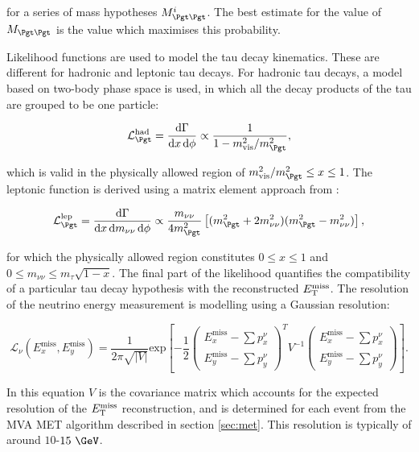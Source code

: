 for a series of mass hypotheses $M_{\Pgt\Pgt}^{i}$. The best estimate for the
value of $M_{\Pgt\Pgt}$ is the value which maximises this probability. 

Likelihood functions are used to model the tau decay kinematics. These are
different for hadronic and leptonic tau decays. For hadronic tau decays, a model
based on two-body phase space is used\cite{PDG}, in which all the decay products of the
tau are grouped to be one particle:

\begin{equation}
\mathcal{L}_{\Pgt}^{\text{had}} = \frac{\text{d}\Gamma}{\text{d}x\,\text{d}\phi}
\propto \frac{1}{1 - m_{\text{vis}}^{2} / m_{\Pgt}^{2}},
\end{equation}

which is valid in the physically allowed region of $m_{\text{vis}}^{2} /
m_{\Pgt}^{2} \leq x \leq 1$. The leptonic function is derived using a matrix
element approach from \cite{TauPol}:

\begin{equation}
\mathcal{L}_{\Pgt}^{\text{lep}} =
\frac{\text{d}\Gamma}{\text{d}x\,\text{d}m_{\nu\nu}\,\text{d}\phi} \propto
\frac{m_{\nu\nu}}{4m_{\Pgt}^{2}}\left[(m_{\Pgt}^{2}+2m_{\nu\nu}^{2})(m_{\Pgt}^{2}-m_{\nu\nu}^{2})\right],
\end{equation}

for which the physically allowed region constitutes $0 \leq x \leq 1$ and $0
\leq m_{\nu\nu} \leq m_{\tau}\sqrt{1-x}$. The final part of the likelihood
quantifies the compatibility of a particular tau decay hypothesis with the
reconstructed $E_{\mathrm{T}}^{\text{miss}}$. The resolution of the neutrino energy measurement is
modelling using a Gaussian resolution:

\begin{equation}
\mathcal{L}_{\nu}(E_{x}^{\text{miss}},E_{y}^{\text{miss}}) =
\frac{1}{2\pi\sqrt{|V|}}\text{exp}\left[
-\frac{1}{2}\begin{pmatrix}E_{x}^{\text{miss}}-\sum p_{x}^{\nu} \\
E_{y}^{\text{miss}}-\sum p_{y}^{\nu}\end{pmatrix}^{T} V^{-1}
\begin{pmatrix}E_{x}^{\text{miss}}-\sum p_{x}^{\nu} \\ E_{y}^{\text{miss}}-\sum
p_{y}^{\nu}\end{pmatrix}\right].
\end{equation}

In this equation $V$ is the covariance matrix which accounts for the expected
resolution of the $E_{\mathrm{T}}^{\text{miss}}$ reconstruction, and is determined for each event from
the MVA MET algorithm described in section \ref{sec:met}. This resolution is
typically of around $10$-$15~\GeV$. 

